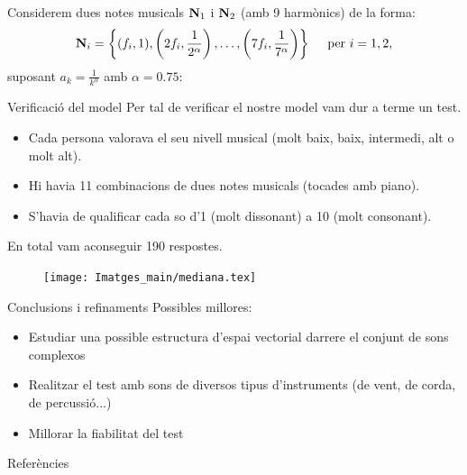 \documentclass[10pt,hyperref={colorlinks,linkcolor=black,citecolor=blue!80,urlcolor=blue!60},handout]{beamer} %
\theoremstyle{definition}
\newcommand{\0}{\ensuremath{\vb{0}}}
\newcommand{\N}{\ensuremath{\vb{N}}}
\begin{document}
\begin{frame}
    Considerem dues notes musicals $\N_1$ i $\N_2$ (amb 9 harmònics) de la forma: $$\N_i=\left\{(f_i,1),\left(2f_i,\frac{1}{2^\alpha}\right),\ldots,\left(7f_i,\frac{1}{7^\alpha}\right)\right\}\quad\text{ per }i=1,2,$$ suposant $a_k=\frac{1}{k^\alpha}$ amb $\alpha=0.75$:\pause
    \begin{figure}
        \centering
        
    \end{figure}
\end{frame}
\begin{frame}{Verificació del model}
    Per tal de verificar el nostre model vam dur a terme un test. \pause
    \begin{itemize}
        \item Cada persona valorava el seu nivell musical (molt baix, baix, intermedi, alt o molt alt).\pause
        \item Hi havia 11 combinacions de dues notes musicals (tocades amb piano).\pause
        \item S'havia de qualificar cada so d'1 (molt dissonant) a 10 (molt consonant).
    \end{itemize}\pause
    En total vam aconseguir 190 respostes.
    \begin{figure}
        \centering
        \texttt{[image: Imatges\_main/mediana.tex]}
    \end{figure}
\end{frame}
\begin{frame}{Conclusions i refinaments}
    Possibles millores:\pause
    \begin{itemize}
        \item Estudiar una possible estructura d'espai vectorial darrere el conjunt de sons complexos\pause
        \item Realitzar el test amb sons de diversos tipus d'instruments (de vent, de corda, de percussió...)\pause
        \item Millorar la fiabilitat del test
    \end{itemize}
\end{frame}
\begin{frame}[noframenumbering]{Referències}
    \printbibliography[heading=none]
\end{frame}
\end{document}
